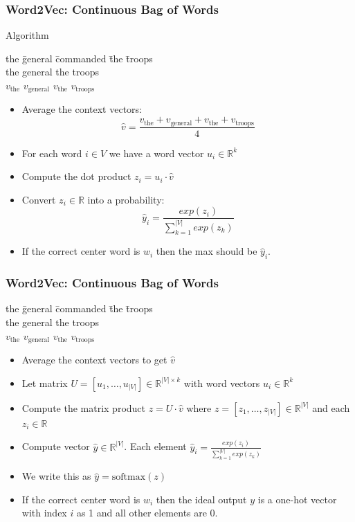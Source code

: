 \begin{frame}
\frametitle{Word2Vec: Continuous Bag of Words}
\begin{block}{Algorithm}
\begin{tabbing}
the \= general \= commanded \= the \= troops\kill \\
the \> general \> \rlap{\underline{\hphantom{commanded}}} \> the \> troops \\
$v_{\textrm{the}}$ \> $v_{\textrm{general}}$ \> \> $v_{\textrm{the}}$ \> $v_{\textrm{troops}}$ 
\end{tabbing}
\begin{itemize}[<+->]
	\item Average the context vectors:
	\[ \hat{v} = \frac{v_{\textrm{the}} + v_{\textrm{general}} + v_{\textrm{the}} + v_{\textrm{troops}}}{4} \]
	\item For each word $i \in V$ we have a word vector $u_i \in \mathbb{R}^k$
	\item Compute the dot product $z_i = u_i \cdot \hat{v}$
	\item Convert $z_i \in \mathbb{R}$ into a probability:
	\[ \hat{y}_i = \frac{exp(z_i)}{\sum_{k=1}^{|V|} exp(z_k)} \]
	\item If the correct center word is $w_i$ then the max should be $\hat{y}_i$.
\end{itemize}	
\end{block}
\end{frame}

\begin{frame}
\frametitle{Word2Vec: Continuous Bag of Words}
\begin{tabbing}
the \= general \= commanded \= the \= troops\kill \\
the \> general \> \rlap{\underline{\hphantom{commanded}}} \> the \> troops \\
$v_{\textrm{the}}$ \> $v_{\textrm{general}}$ \> \> $v_{\textrm{the}}$ \> $v_{\textrm{troops}}$ 
\end{tabbing}
\begin{itemize}[<+->]
	\item Average the context vectors to get $\hat{v}$
	\item Let matrix $U = [ u_1, \ldots, u_{|V|} ] \in \mathbb{R}^{|V| \times k}$ with word vectors $u_i \in \mathbb{R}^k$
	\item Compute the matrix product $z = U \cdot \hat{v}$ where $z = [ z_1, \ldots, z_{|V|} ] \in \mathbb{R}^{|V|}$ and each $z_i \in \mathbb{R}$
	\item Compute vector $\hat{y} \in \mathbb{R}^{|V|}$. Each element $\hat{y}_i = \frac{exp(z_i)}{\sum_{k=1}^{|V|} exp(z_k)} $
	\item We write this as $\hat{y} = \textrm{softmax}(z)$
	\item If the correct center word is $w_i$ then the ideal output $y$ is a one-hot vector with index $i$ as 1 and all other elements are 0.
\end{itemize}
\end{frame}

